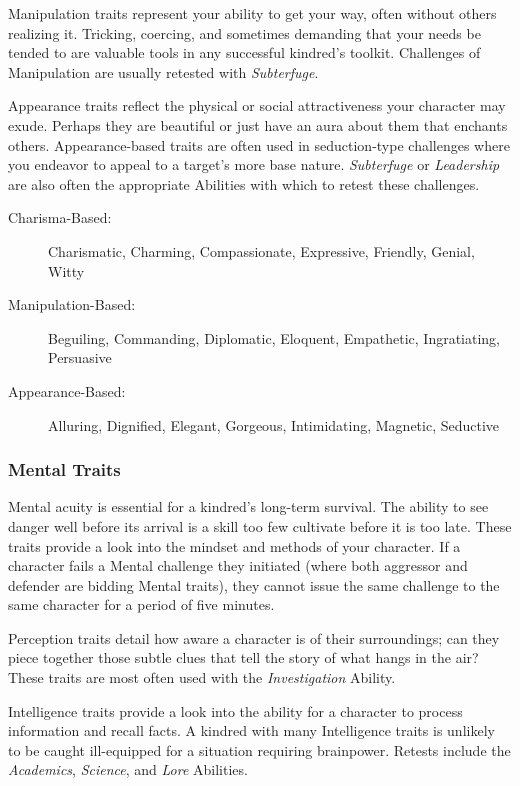 Manipulation traits represent your ability to get your way, often without 
others realizing it.  Tricking, coercing, and sometimes demanding that 
your needs be tended to are valuable tools in any successful kindred's 
toolkit.  Challenges of Manipulation are usually retested with \emph{Subterfuge}.

Appearance traits reflect the physical or social attractiveness your 
character may exude.  Perhaps they are beautiful or just have an aura 
about them that enchants others.  Appearance-based traits are often used 
in seduction-type challenges where you endeavor to appeal to a target's more 
base nature.  \emph{Subterfuge} or \emph{Leadership} are also often the 
appropriate Abilities with which to retest these challenges.

\begin{description}
	\item[Charisma-Based:]  Charismatic, Charming, Compassionate, 
	Expressive, Friendly, Genial, Witty
	\item[Manipulation-Based:]  Beguiling, Commanding, Diplomatic, Eloquent, 
	Empathetic, Ingratiating, Persuasive
	\item[Appearance-Based:]  Alluring, Dignified, Elegant, Gorgeous, 
	Intimidating, Magnetic, Seductive
\end{description}

\subsubsection{Mental Traits}
Mental acuity is essential for a kindred's long-term survival.  The 
ability to see danger well before its arrival is a skill too few 
cultivate before it is too late.  These traits provide a look into the 
mindset and methods of your character.  If a character fails a Mental 
challenge they initiated (where both aggressor and defender are bidding 
Mental traits), they cannot issue the same challenge to the same character 
for a period of five minutes.

Perception traits detail how aware a character is of their surroundings; 
can they piece together those subtle clues that tell the story of what 
hangs in the air?  These traits are most often used with the 
\emph{Investigation} Ability.

Intelligence traits provide a look into the ability for a character to 
process information and recall facts.  A kindred with many Intelligence 
traits is unlikely to be caught ill-equipped for a situation requiring 
brainpower.  Retests include the \emph{Academics}, \emph{Science}, and 
\emph{Lore} Abilities.

